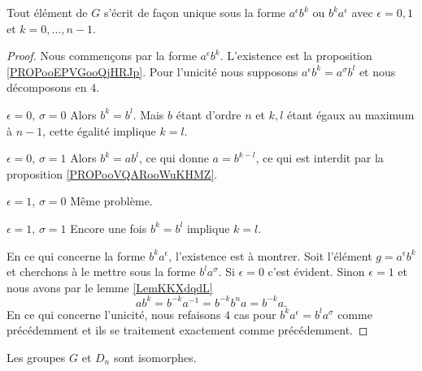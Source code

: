 \begin{lemma}        \label{LemooNFRIooPWuikH}
    Tout élément de \( G\) s'écrit de façon unique sous la forme \( a^{\epsilon}b^k\) ou \( b^ka^{\epsilon}\) avec \( \epsilon=0,1\) et \( k=0,\ldots, n-1\).
\end{lemma}

\begin{proof}
    Nous commençons par la forme \( a^{\epsilon}b^k\). L'existence est la proposition \ref{PROPooEPVGooQjHRJp}. Pour l'unicité nous supposons \( a^{\epsilon}b^k=a^{\sigma}b^l\) et nous décomposons en \( 4\).
    \begin{subproof}
        \item[\( \epsilon=0\), \( \sigma=0\)]
            Alors \( b^k=b^l\). Mais \( b\) étant d'ordre \( n\) et \( k,l\) étant égaux au maximum à \( n-1\), cette égalité implique \( k=l\).
        \item[\( \epsilon=0\), \( \sigma=1\)]
            Alors \( b^k=ab^l\), ce qui donne \( a=b^{k-l}\), ce qui est interdit par la proposition \ref{PROPooVQARooWuKHMZ}.
        \item[\( \epsilon=1\), \( \sigma=0\)]
            Même problème.
        \item[\( \epsilon=1\), \( \sigma=1\)]
            Encore une fois \( b^k=b^l\) implique \( k=l\).
    \end{subproof}
    En ce qui concerne la forme \( b^ka^{\epsilon}\), l'existence est à montrer. Soit l'élément \( g=a^{\epsilon}b^k\) et cherchons à le mettre sous la forme \( b^la^{\sigma}\). Si \( \epsilon=0\) c'est évident. Sinon \( \epsilon=1\) et nous avons par le lemme \ref{LemKKXdqdL}
    \begin{equation}
        ab^k=b^{-k}a^{-1}=b^{-k}b^na=b^{-k}a.
    \end{equation}
    En ce qui concerne l'unicité, nous refaisons \( 4\) cas pour \( b^ka^{\epsilon}=b^la^{\sigma}\) comme précédemment et ils se traitement exactement comme précédemment.
\end{proof}

\begin{theorem}
    Les groupes \( G\) et \( D_n\) sont isomorphes.
\end{theorem}

